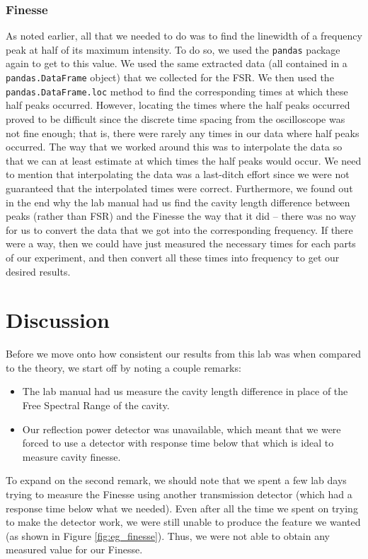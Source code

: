 \documentclass[twocolumn,amsmath,amssymb,pra]{revtex4-2}
\begin{document}
\subsubsection{Finesse}
As noted earlier, all that we needed to do was to find the linewidth of a frequency peak at half of its maximum intensity. 
To do so, we used the \texttt{pandas} package again to get to this value. We used the same extracted data (all contained in a \texttt{pandas.DataFrame} object) that we collected for the FSR. We then used the \texttt{pandas.DataFrame.loc} method to find the corresponding times at which these half peaks occurred.
However, locating the times where the half peaks occurred proved to be difficult since the discrete time spacing from the oscilloscope was not fine enough; that is, there were rarely any times in our data where half peaks occurred. The way that we worked around this was to interpolate the data so that we can at least estimate at which times the half peaks would occur. We need to mention that interpolating the data was a last-ditch effort since we were not guaranteed that the interpolated times were correct. Furthermore, we found out in the end why the lab manual had us find the cavity length difference between peaks (rather than FSR) and the Finesse the way that it did -- there was no way for us to convert the data that we got into the corresponding frequency. If there were a way, then we could have just measured the necessary times for each parts of our experiment, and then convert all these times into frequency to get our desired results.

\section{Discussion}
Before we move onto how consistent our results from this lab was when compared to the theory, we start off by noting a couple remarks:
\begin{itemize}
    \item The lab manual had us measure the cavity length difference in place of the Free Spectral Range of the cavity.
    \item Our reflection power detector was unavailable, which meant that we were forced to use a detector with response time below that which is ideal to measure cavity finesse.
\end{itemize}
To expand on the second remark, we should note that we spent a few lab days trying to measure the Finesse using another transmission detector (which had a response time below what we needed). Even after all the time we spent on trying to make the detector work, we were still unable to produce the feature we wanted (as shown in Figure \ref{fig:eg_finesse}). Thus, we were not able to obtain any measured value for our Finesse.
\end{document}
